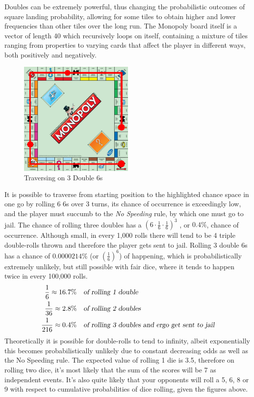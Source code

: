 \documentclass[12pt]{article}
\begin{document}
Doubles can be extremely powerful, thus changing the probabilistic outcomes of square landing probability, allowing for some tiles to obtain higher and lower frequencies than other tiles over the long run. The Monopoly board itself is a vector of length 40 which recursively loops on itself, containing a mixture of tiles ranging from properties to varying cards that affect the player in different ways, both positively and negatively. 
\begin{figure}[h]
\centering
\includegraphics[width=0.5\textwidth]{triple_traverse.jpg}
\caption{Traversing on 3 Double 6s}
\end{figure}
It is possible to traverse from starting position to the highlighted chance space in one go by rolling 6 6s over 3 turns, its chance of occurrence is exceedingly low, and the player must succumb to the \emph{No Speeding} rule, by which one must go to jail. The chance of rolling three doubles has a $\left(6 \cdot \frac{1}{6} \cdot \frac{1}{6}\right)^3$ , or $0.4\%$, chance of occurrence. Although small, in every 1,000 rolls there will tend to be 4 triple double-rolls thrown and therefore the player gets sent to jail. Rolling 3 double 6s has a chance of $0.0000214\%$ (or $\left(\frac{1}{6}\right)^{6}$) of happening, which is probabilistically extremely unlikely, but still possible with fair dice, where it tends to happen twice in every 100,000 rolls.
\begin{align*}
\frac{1}{6}\approx16.7\% \quad &\textsl{of rolling 1 double}\\
\frac{1}{36}\approx2.8\% \quad &\textsl{of rolling 2 doubles}\\
\frac{1}{216}\approx0.4\% \quad &\textsl{of rolling 3 doubles and ergo get sent to jail} 
\end{align*}
Theoretically it is possible for double-rolls to tend to infinity, albeit exponentially this becomes probabilistically unlikely due to constant decreasing odds as well as the No Speeding rule.
The expected value of rolling 1 die is 3.5, therefore on rolling two dice, it's most likely that the sum of the scores will be 7 as independent events. It's also quite likely that your opponents will roll a 5, 6, 8 or 9 with respect to cumulative probabilities of dice rolling, given the figures above.
\end{document}
